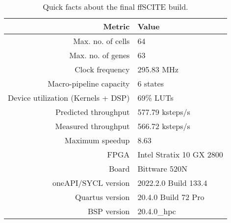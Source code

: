 \begin{table}
    \centering
    \begin{tabular}{r|l}
        \textbf{Metric}                     & \textbf{Value} \\
        \hline
        Max. no. of cells                   & 64 \\
        Max. no. of genes                   & 63 \\
        \hline
        Clock frequency                     & 295.83 MHz \\
        Macro-pipeline capacity             & 6 states \\
        Device utilization (Kernels + DSP)  & 69\% \acsp{LUT} \\
        Predicted throughput                & 577.79 ksteps/s \\
        Measured throughput                 & 566.72 ksteps/s \\
        Maximum speedup                     & 8.63 \\
        \hline
        \ac{FPGA}                           & Intel Stratix 10 GX 2800 \\
        Board                               & Bittware 520N \\
        oneAPI/SYCL version                 & 2022.2.0 Build 133.4 \\
        Quartus version                     & 20.4.0 Build 72 Pro \\
        BSP version                         & 20.4.0\_hpc \\
    \end{tabular}
    \caption{Quick facts about the final \ac{ffSCITE} build.}
    \label{tab:quickfacts}
\end{table}




